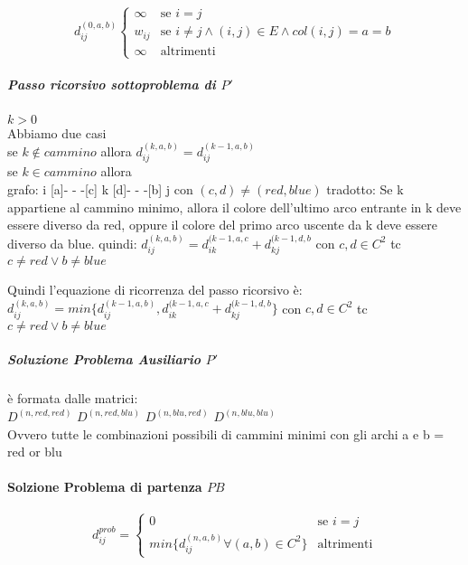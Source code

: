 \documentclass[12pt, a4paper, openany]{book}
\begin{document}
    \begin{equation*}
        d^{(0,a,b)}_{ij} \begin{cases}
            \infty & \text{se $i=j$}                                             \\
            w_{ij} & \text{se $i\neq j \land (i,j)\in E \land col(i,j) = a = b$} \\
            \infty & \text{altrimenti}
        \end{cases}
    \end{equation*}

    \subparagraph{Passo ricorsivo sottoproblema di $P'$} $k > 0$\\
    Abbiamo due casi\\
    se $k \notin cammino$ allora $d^{(k,a,b)}_{ij} = d^{(k-1,a,b)}_{ij}$\\
    se $k \in cammino$ allora \\

    grafo: i [a]- - -[c] k [d]- - -[b] j con $(c,d) \neq (red,blue)$
    tradotto: Se k appartiene al cammino minimo, allora il colore dell'ultimo arco entrante in k deve essere diverso da red, oppure il colore del primo arco uscente da k deve essere diverso da blue.
    quindi: $d^{(k,a,b)}_{ij} = d^{(k-1,a,c}_{ik} + d^{(k-1,d,b}_{kj}$ con $c,d \in C^2$ tc $c\neq red \vee b\neq blue$

    Quindi l'equazione di ricorrenza del passo ricorsivo è:\\
$d^{(k,a,b)}_{ij} = min\{d^{(k-1,a,b)}_{ij} ,d^{(k-1,a,c}_{ik} + d^{(k-1,d,b}_{kj}\}$ con $c,d \in C^2$ tc $c\neq red \vee b\neq blue$

    \subparagraph{Soluzione Problema Ausiliario $P'$} è formata dalle matrici:\\
$D^{(n,red,red)}$ $D^{(n,red,blu)}$ $D^{(n,blu,red)}$ $D^{(n,blu,blu)}$ \\
    Ovvero tutte le combinazioni possibili di cammini minimi con gli archi a e b = red or blu

    \paragraph{Solzione Problema di partenza $PB$}
    \begin{equation*}
        d^{prob}_{ij} = \begin{cases}
            0                                             & \text{se $i=j$}   \\
            min\{d^{(n,a,b)}_{ij} \forall (a,b) \in C^2\} & \text{altrimenti}
        \end{cases}
    \end{equation*}
\end{document}
